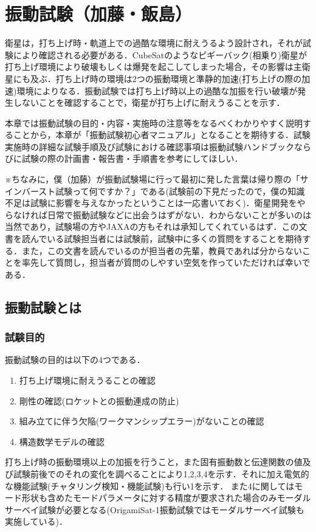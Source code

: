 \section{振動試験（加藤・飯島）}
衛星は，打ち上げ時・軌道上での過酷な環境に耐えうるよう設計され，それが試験により確認される必要がある．CubeSatのようなピギーバック(相乗り)衛星が打ち上げ環境により破壊もしくは爆発を起こしてしまった場合，その影響は主衛星にも及ぶ．打ち上げ時の環境は2つの振動環境と準静的加速(打ち上げの際の加速)環境によりなる．振動試験では打ち上げ時以上の過酷な加振を行い破壊が発生しないことを確認することで，衛星が打ち上げに耐えうることを示す．\par
本章では振動試験の目的・内容・実施時の注意等をなるべくわかりやすく説明することから，本章が「振動試験初心者マニュアル」となることを期待する．試験実施時の詳細な試験手順及び試験における確認事項は振動試験ハンドブック\cite{vibration_test_handbook}ならびに試験の際の計画書・報告書・手順書\cite{EM_vibration_test_manual}\cite{EM_vibration_test_report}\cite{EM_vibration_test_plan}\cite{FM_vibration_test_manual}\cite{FM_vibration_test_report}\cite{FM_vibration_test_plan}\cite{re_FM_vibration_test_manual}\cite{re_FM_vibration_test_report}\cite{re_FM_vibration_test_plan}を参考にしてほしい．\par
\vspace{\baselineskip}
※ちなみに，僕（加藤）が振動試験場に行って最初に発した言葉は帰り際の「サインバースト試験って何ですか？」である(試験前の下見だったので，僕の知識不足は試験に影響を与えなかったということは一応書いておく)．衛星開発をやらなければ日常で振動試験などに出会うはずがない．わからないことが多いのは当然であり，試験場の方やJAXAの方もそれは承知してくれているはず．この文書を読んでいる試験担当者には試験前，試験中に多くの質問をすることを期待する．また，この文書を読んでいるのが担当者の先輩，教員であれば分からないことを率先して質問し，担当者が質問のしやすい空気を作っていただければ幸いである．

\subsection{振動試験とは}
\subsubsection{試験目的}
振動試験の目的は以下の4つである．
\begin{enumerate}
	\item 打ち上げ環境に耐えうることの確認
	\item 剛性の確認(ロケットとの振動連成の防止)
	\item 組み立てに伴う欠陥(ワークマンシップエラー)がないことの確認
	\item 構造数学モデルの確認
\end{enumerate}
打ち上げ時の振動環境以上の加振を行うこと，また固有振動数と伝達関数の値及び試験前後でのそれの変化を調べることにより1,2,3,4を示す．それに加え電気的な機能試験(チャタリング検知・機能試験)も行い1を示す．
また4に関してはモード形状も含めたモードパラメータに対する精度が要求された場合のみモーダルサーベイ試験が必要となる(OrigamiSat-1振動試験ではモーダルサーベイ試験も実施している)．

